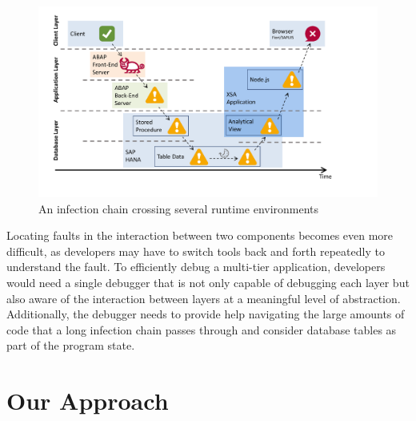 \begin{figure}[t]
\centering
\includegraphics[width=.9\linewidth]{img/worstcase}
\caption{An infection chain crossing several runtime environments}
\label{fig:worstcase}
\end{figure}

Locating faults in the interaction between two components becomes even more difficult, as developers may have to switch tools back and forth repeatedly to understand the fault.
To efficiently debug a multi-tier application, developers would need a single debugger that is not only capable of debugging each layer but also aware of the interaction between layers at a meaningful level of abstraction.
Additionally, the debugger needs to provide help
navigating the large amounts of code that a long infection chain passes through
and consider database tables as part of the program state.



\section{Our Approach} %

